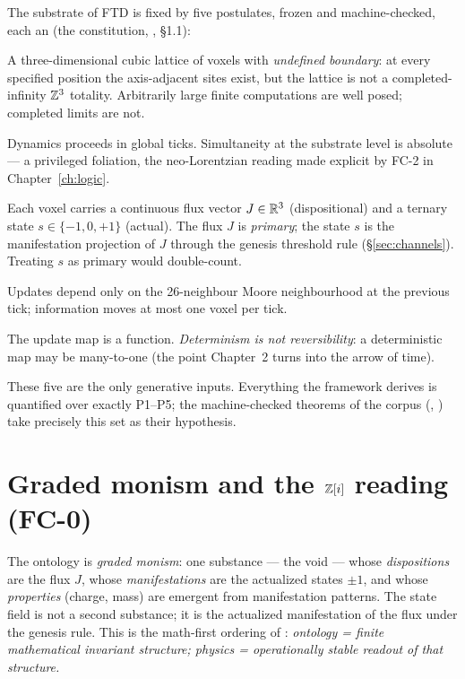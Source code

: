 The substrate of FTD is fixed by five postulates, frozen and machine-checked, each
an  (the constitution, , \S1.1):

\begin{description}[leftmargin=1.6em,style=nextline,itemsep=2pt]
  \item[P1 --- Discrete space.] A three-dimensional cubic lattice of voxels with
    \emph{undefined boundary}: at every specified position the axis-adjacent sites
    exist, but the lattice is not a completed-infinity $\mathbb{Z}^3$ totality.
    Arbitrarily large finite computations are well posed; completed limits are not.
  \item[P2 --- Discrete time.] Dynamics proceeds in global ticks. Simultaneity at
    the substrate level is absolute --- a privileged foliation, the neo-Lorentzian
    reading made explicit by FC-2 in Chapter~\ref{ch:logic}. 
  \item[P3 --- Ternary states, $J$-primary.] Each voxel carries a continuous flux
    vector $J\in\mathbb{R}^3$ (dispositional) and a ternary state $s\in\{-1,0,+1\}$
    (actual). The flux $J$ is \emph{primary}; the state $s$ is the manifestation
    projection of $J$ through the genesis threshold rule (\S\ref{sec:channels}).
    Treating $s$ as primary would double-count. 
  \item[P4 --- Local causality.] Updates depend only on the 26-neighbour Moore
    neighbourhood at the previous tick; information moves at most one voxel per
    tick. 
  \item[P5 --- Determinism.] The update map is a function. \emph{Determinism is not
    reversibility}: a deterministic map may be many-to-one (the point Chapter~2
    turns into the arrow of time). 
\end{description}

These five are the only generative inputs. Everything the framework derives is
quantified over exactly P1--P5; the machine-checked theorems of the corpus
(, ) take precisely this set as their hypothesis.

\section{Graded monism and the \texorpdfstring{$\mathbb{Z}[i]$}{Z[i]} reading (FC-0)}\label{sec:gradedmonism}

The ontology is \emph{graded monism}: one substance --- the void --- whose
\emph{dispositions} are the flux $J$, whose \emph{manifestations} are the
actualized states $\pm1$, and whose \emph{properties} (charge, mass) are emergent
from manifestation patterns. The state field is not a second substance; it is the
actualized manifestation of the flux under the genesis rule. This is the
math-first ordering of : \emph{ontology = finite mathematical
invariant structure; physics = operationally stable readout of that structure.}

